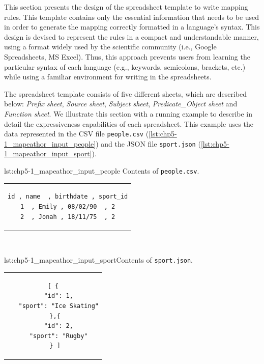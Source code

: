 This section presents the design of the spreadsheet template to write mapping rules. 
This template contains only the essential information that needs to be used in order to generate the mapping correctly formatted in a language's syntax. 
This design is devised to represent the rules in a compact and understandable manner, using a format widely used by the scientific community (i.e., Google Spreadsheets, MS Excel).
Thus, this approach prevents users from learning the particular syntax of each language (e.g., keywords, semicolons, brackets, etc.) while using a familiar environment for writing in the spreadsheets. 

The spreadsheet template consists of five different sheets, which are described below: \textit{Prefix sheet}, \textit{Source sheet}, \textit{Subject sheet}, \textit{Predicate\_Object sheet} and \textit{Function sheet}. We illustrate this section with a running example to describe in detail the expressiveness capabilities of each spreadsheet. This example uses the data represented in the CSV file \texttt{people.csv} (\cref{lst:chp5-1_mapeathor_input_people}) and the JSON file \texttt{sport.json} (\cref{lst:chp5-1_mapeathor_input_sport}).

\begin{minipage}{0.48\linewidth}
\begin{captionedlisting}{lst:chp5-1_mapeathor_input_people}{ Contents of \texttt{people.csv}.}
\centering
\begin{tabular}{c}
{
\begin{lstlisting}[basicstyle=\ttfamily\small,label={list:example1},columns=flexible]
id , name  , birthdate , sport_id
1  , Emily , 08/02/90  , 2
2  , Jonah , 18/11/75  , 2
\end{lstlisting}
}
\end{tabular}
\end{captionedlisting}
\end{minipage}
\,\,\,\,\hfill
\begin{minipage}{0.52\linewidth}
\begin{captionedlisting}{lst:chp5-1_mapeathor_input_sport}{Contents of \texttt{sport.json}.}
\centering
\begin{tabular}{c}
\hspace{1.5em}
{
\begin{lstlisting}[basicstyle=\ttfamily\small,label={list:example1},columns=flexible]
[ {
   "id": 1,
   "sport": "Ice Skating"
 },{
   "id": 2,
   "sport": "Rugby"
 } ]
\end{lstlisting}
}
\end{tabular}
\end{captionedlisting}
\end{minipage}

